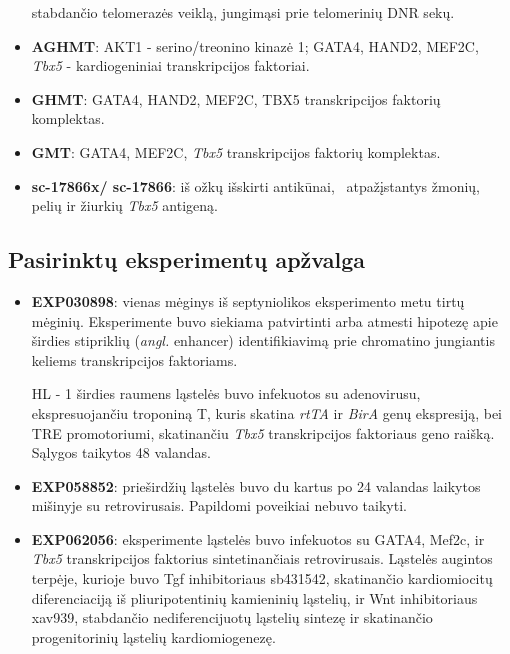 \documentclass[12pt]{article}
\begin{document}
\begin{itemize}
          stabdančio telomerazės veiklą, jungimąsi prie telomerinių
          DNR sekų.
    \item \textbf{AGHMT}: AKT1 - serino/treonino kinazė 1; GATA4,
          HAND2, MEF2C, \emph{Tbx5} - kardiogeniniai transkripcijos faktoriai.
    \item \textbf{GHMT}: GATA4, HAND2, MEF2C, TBX5 transkripcijos
          faktorių komplektas.
    \item \textbf{GMT}: GATA4, MEF2C, \emph{Tbx5}  transkripcijos
          faktorių komplektas.
    \item \textbf{sc-17866x/ sc-17866}: iš ožkų išskirti antikūnai,
    \     atpažįstantys žmonių, pelių ir žiurkių \emph{Tbx5} antigeną.
\end{itemize}


\subsection{Pasirinktų eksperimentų apžvalga}
\begin{itemize}
    \item \textbf{EXP030898}: vienas mėginys iš septyniolikos eksperimento
        metu tirtų mėginių. Eksperimente buvo siekiama patvirtinti arba
        atmesti hipotezę apie širdies stipriklių (\emph{angl.} enhancer)
        identifikiavimą prie chromatino jungiantis keliems transkripcijos
        faktoriams.

        HL - 1 širdies raumens ląstelės buvo infekuotos
        su adenovirusu, ekspresuojančiu troponiną T, kuris skatina
        \emph{rtTA} ir \emph{BirA} genų ekspresiją, bei TRE promotoriumi,
        skatinančiu \emph{Tbx5} transkripcijos faktoriaus geno raišką.
        Sąlygos taikytos 48 valandas.
    \item \textbf{EXP058852}: prieširdžių ląstelės buvo du kartus po 24
        valandas laikytos mišinyje su retrovirusais. Papildomi poveikiai
        nebuvo taikyti.
    \item \textbf{EXP062056}: eksperimente ląstelės buvo infekuotos su
        GATA4, Mef2c, ir \emph{Tbx5} transkripcijos faktorius sintetinančiais
        retrovirusais. Ląstelės augintos terpėje, kurioje buvo {Tgf\textbeta}
        inhibitoriaus sb431542, skatinančio kardiomiocitų diferenciaciją
        iš pliuripotentinių kamieninių ląstelių, ir Wnt inhibitoriaus
        xav939, stabdančio nediferencijuotų ląstelių sintezę ir
        skatinančio progenitorinių ląstelių kardiomiogenezę.
\end{itemize}
\end{document}
